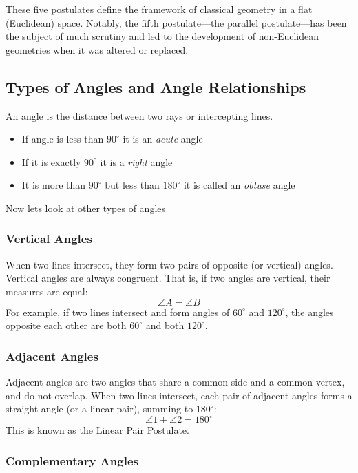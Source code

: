 These five postulates define the framework of classical geometry in a flat (Euclidean) space. Notably, the fifth postulate—the parallel postulate—has been the subject of much scrutiny and led to the development of non-Euclidean geometries when it was altered or replaced.

\subsection{Types of Angles and Angle Relationships}

An angle is the distance between two rays or intercepting lines.

\begin{itemize}[label=\(-\)]
	\item If angle is less than \(90^\circ\) it is an \emph{acute} angle
	\item If it is exactly \(90^\circ\) it is a \emph{right} angle
	\item It is more than \(90^\circ\) but less than \(180^\circ\) it is called an \emph{obtuse} angle
\end{itemize}

Now lets look at other types of angles

\subsubsection*{Vertical Angles}

When two lines intersect, they form two pairs of opposite (or vertical) angles. Vertical angles are always congruent. That is, if two angles are vertical, their measures are equal:
\[
\angle A = \angle B
\]
For example, if two lines intersect and form angles of \( 60^\circ \) and \( 120^\circ \), the angles opposite each other are both \( 60^\circ \) and both \( 120^\circ \).

\subsubsection*{Adjacent Angles}

Adjacent angles are two angles that share a common side and a common vertex, and do not overlap. When two lines intersect, each pair of adjacent angles forms a straight angle (or a linear pair), summing to \(180^\circ\):
\[
\angle 1 + \angle 2 = 180^\circ
\]
This is known as the Linear Pair Postulate.

\subsubsection*{Complementary Angles}


